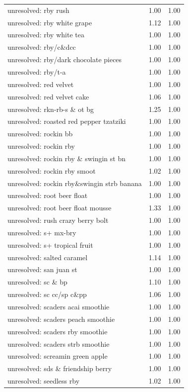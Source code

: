 \begin{table}
\begin{tabular}{lrr}
unresolved: rby rush & 1.00 & 1.00 \\
unresolved: rby white grape & 1.12 & 1.00 \\
unresolved: rby white tea & 1.00 & 1.00 \\
unresolved: rby/c\&dcc & 1.00 & 1.00 \\
unresolved: rby/dark chocolate pieces & 1.00 & 1.00 \\
unresolved: rby/t-a & 1.00 & 1.00 \\
unresolved: red velvet & 1.00 & 1.00 \\
unresolved: red velvet cake & 1.06 & 1.00 \\
unresolved: rkn-rb-s \& ot bg & 1.25 & 1.00 \\
unresolved: roasted red pepper tzatziki & 1.00 & 1.00 \\
unresolved: rockin bb & 1.00 & 1.00 \\
unresolved: rockin rby & 1.00 & 1.00 \\
unresolved: rockin rby \& swingin st bn & 1.00 & 1.00 \\
unresolved: rockin rby smoot & 1.02 & 1.00 \\
unresolved: rockin rby\&swingin strb banana & 1.00 & 1.00 \\
unresolved: root beer float & 1.00 & 1.00 \\
unresolved: root beer float mousse & 1.33 & 1.00 \\
unresolved: rush crazy berry bolt & 1.00 & 1.00 \\
unresolved: s+ mx-bry & 1.00 & 1.00 \\
unresolved: s+ tropical fruit & 1.00 & 1.00 \\
unresolved: salted caramel & 1.14 & 1.00 \\
unresolved: san juan st & 1.00 & 1.00 \\
unresolved: sc \& bp & 1.10 & 1.00 \\
unresolved: sc cc/sp c\&pp & 1.06 & 1.00 \\
unresolved: scaders acai smoothie & 1.00 & 1.00 \\
unresolved: scaders peach smoothie & 1.00 & 1.00 \\
unresolved: scaders rby smoothie & 1.00 & 1.00 \\
unresolved: scaders strb smoothie & 1.00 & 1.00 \\
unresolved: screamin green apple & 1.00 & 1.00 \\
unresolved: sds \& friendship berry & 1.00 & 1.00 \\
unresolved: seedless rby & 1.02 & 1.00 \\

\end{tabular}
\end{table}
